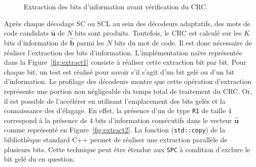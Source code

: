\begin{figure}[t]
  \centering
  \quad
  \caption{Extraction des bits d'information avant vérification du CRC.}
  \label{fig:extract}
\end{figure}

Après chaque décodage SC ou SCL au sein des décodeurs adaptatifs, des mots de code candidats $\mathbold{\hat{u}}$ de $N$ bits sont produits.
Toutefois, le CRC est calculé sur les $K$ bits d'information de $\mathbold{\hat{b}}$ parmi les $N$ bits du mot de code.
Il est donc nécessaire de réaliser l'extraction des bits d'information.
L'implémentation naïve représentée dans la Figure~\ref{fig:extract1} consiste à réaliser cette extraction bit par bit.
Pour chaque bit, un test est réalisé pour savoir s'il s'agit d'un bit gelé ou d'un bit d'information.
Le profilage des décodeurs montre que cette opération d'extraction représente une portion non négligeable du temps total de traitement du CRC.
Or, il est possible de l'accélérer en utilisant l'emplacement des bits gelés et la connaissance des \noeuds d'élagage.
En effet, la présence d'un \noeud de type \texttt{R1} de taille $4$ correspond à la présence de $4$ bits d'information consécutifs dans le vecteur $\mathbold{\hat{u}}$ comme représenté en Figure~\ref{fig:extract2}.
La fonction (\texttt{std::copy}) de la bibliothèque standard C++ permet de réaliser une extraction parallèle de plusieurs bits.
Cette technique peut être étendue aux \noeuds \texttt{SPC} à condition d'exclure le bit gelé du \noeud en question.


